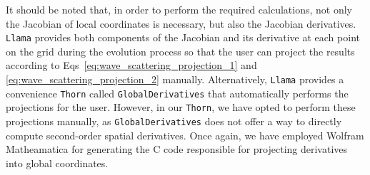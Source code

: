 It should be noted that, in order to perform the required calculations, not only the Jacobian of local coordinates is necessary, but also the Jacobian derivatives. \texttt{Llama} provides both components of the Jacobian and its derivative at each point on the grid during the evolution process so that the user can project the results according to Eqs~\eqref{eq:wave_scattering_projection_1} and \eqref{eq:wave_scattering_projection_2} manually. Alternatively, \texttt{Llama} provides a convenience \texttt{Thorn} called \texttt{GlobalDerivatives} that automatically performs the projections for the user. However, in our \texttt{Thorn}, we have opted to perform these projections manually, as \texttt{GlobalDerivatives} does not offer a way to directly compute second-order spatial derivatives. Once again, we have employed Wolfram Matheamatica for generating the C code responsible for projecting derivatives into global coordinates.
